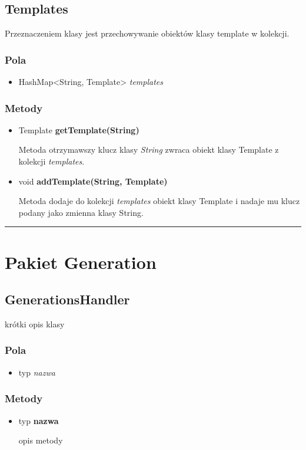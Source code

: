 \documentclass[a4paper,11pt]{article}
\newcommand{\linia}{\rule{\linewidth}{0.4mm}}
\begin{document}
\subsection{Templates}
Przeznaczeniem klasy jest przechowywanie obiektów klasy template w kolekcji.
\subsubsection{Pola}
\begin{itemize}
\item HashMap<String, Template> \textit{templates}
\end{itemize}
\subsubsection{Metody}
\begin{itemize}
\item Template \textbf{getTemplate(String)}

Metoda otrzymawszy klucz klasy \textit{String} zwraca obiekt klasy Template z kolekcji \textit{templates}.
\item void \textbf{addTemplate(String, Template)}

Metoda dodaje do kolekcji \textit{templates} obiekt klasy Template i nadaje mu klucz podany jako zmienna klasy String.
\end{itemize}
\noindent\linia

\section{Pakiet Generation}



\subsection{GenerationsHandler}
krótki opis klasy
\subsubsection{Pola}
\begin{itemize}
\item typ  \textit{nazwa}
\end{itemize}
\subsubsection{Metody}
\begin{itemize}
\item typ  \textbf{nazwa}

opis metody
\end{itemize}
\end{document}
